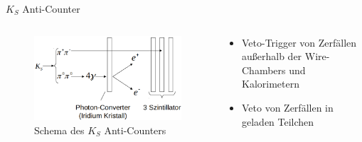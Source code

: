 \documentclass[aspectratio=1610, professionalfonts, 9pt, t]{beamer}
\begin{document}
  \begin{frame}{$K_S$ Anti-Counter}
    \begin{columns}[onlytextwidth]
      \begin{column}{0.4\textwidth}
        \begin{figure}[ht]
          \begin{center}
            \includegraphics[width=1.2\textwidth]{Images/na48aksschema.png} %
            \caption{Schema des $K_S$ Anti-Counters}
          \end{center}
        \end{figure}
      \end{column}
      \begin{column}{0.5\textwidth}
        \begin{itemize}
          \item Veto-Trigger von Zerfällen außerhalb der Wire-Chambers und Kalorimetern
          \item[\rightarrow] Veto von Zerfällen in geladen Teilchen
        \end{itemize}
      \end{column}
    \end{columns}
  \end{frame}
\end{document}
